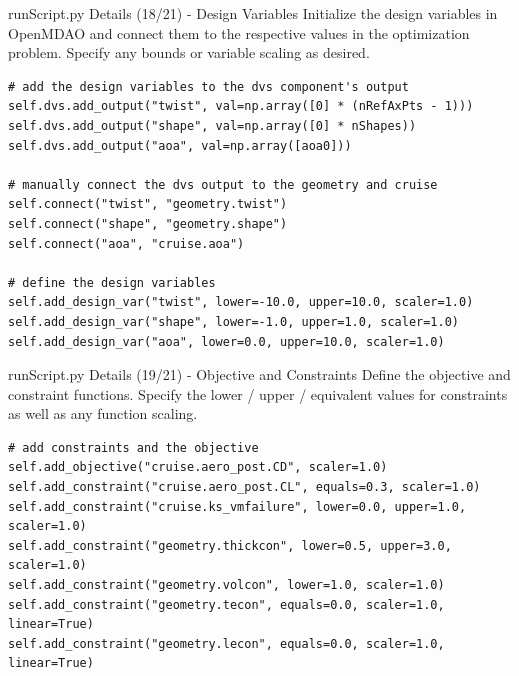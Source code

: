 \documentclass{bredelebeamer}
\begin{document}
\begin{frame}[fragile]{runScript.py Details (18/21) - \large Design Variables}
Initialize the design variables in OpenMDAO and connect them to the respective values in the optimization problem. Specify any bounds or variable scaling as desired.
\scriptsize
\lstset{ language=bash }
\begin{lstlisting}
# add the design variables to the dvs component's output
self.dvs.add_output("twist", val=np.array([0] * (nRefAxPts - 1)))
self.dvs.add_output("shape", val=np.array([0] * nShapes))
self.dvs.add_output("aoa", val=np.array([aoa0]))

# manually connect the dvs output to the geometry and cruise
self.connect("twist", "geometry.twist")
self.connect("shape", "geometry.shape")
self.connect("aoa", "cruise.aoa")

# define the design variables
self.add_design_var("twist", lower=-10.0, upper=10.0, scaler=1.0)
self.add_design_var("shape", lower=-1.0, upper=1.0, scaler=1.0)
self.add_design_var("aoa", lower=0.0, upper=10.0, scaler=1.0)
\end{lstlisting}
\normalsize
\end{frame}

\begin{frame}[fragile]{runScript.py Details (19/21) - \large Objective and Constraints}
Define the objective and constraint functions. Specify the lower / upper / equivalent values for constraints as well as any function scaling.
\scriptsize
\lstset{ language=bash }
\begin{lstlisting}
# add constraints and the objective
self.add_objective("cruise.aero_post.CD", scaler=1.0)
self.add_constraint("cruise.aero_post.CL", equals=0.3, scaler=1.0)
self.add_constraint("cruise.ks_vmfailure", lower=0.0, upper=1.0, scaler=1.0)
self.add_constraint("geometry.thickcon", lower=0.5, upper=3.0, scaler=1.0)
self.add_constraint("geometry.volcon", lower=1.0, scaler=1.0)
self.add_constraint("geometry.tecon", equals=0.0, scaler=1.0, linear=True)
self.add_constraint("geometry.lecon", equals=0.0, scaler=1.0, linear=True)
\end{lstlisting}
\normalsize
\end{frame}
\end{document}
